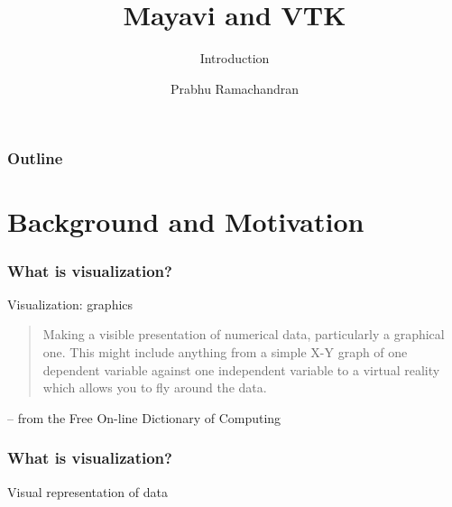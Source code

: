 

\title[Mayavi/VTK]{Mayavi and VTK}
\subtitle{Introduction}
\author[Prabhu]{Prabhu Ramachandran}

\date[] {
\small
\color{darkgreen}{NGCM Summer School\\
Southampton, UK\\
July 1--2, 2019}
}



\begin{frame}
  \maketitle
\end{frame}

\begin{frame}
  \frametitle{Outline}
  \Large
  \tableofcontents
\end{frame}

\section{Background and Motivation}

\begin{frame}
\end{frame}

\begin{frame}
  \frametitle{What is visualization?}
  \begin{block}{Visualization: graphics}
    \begin{quote}
      Making a visible presentation of numerical data, particularly a
      graphical one.  This might include anything from a simple X-Y
      graph of one dependent variable against one independent variable
      to a {virtual reality} which allows you to fly around the data.
    \end{quote}
     -- from the Free On-line Dictionary of Computing
  \end{block}
\end{frame}

\begin{frame}
    \frametitle{What is visualization?}
    \Large
    \begin{center}
    Visual representation of data
    \end{center}
\end{frame}


